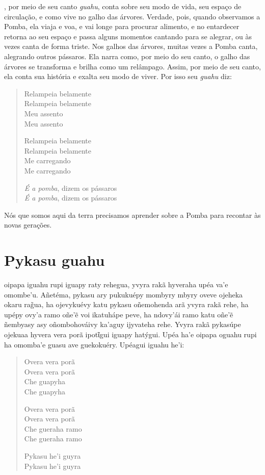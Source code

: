, por meio de seu canto \textit{guahu}, conta sobre seu modo de vida,
seu espaço de circulação, e como vive no galho das árvores. Verdade,
pois, quando observamos a Pomba, ela viaja e voa, e vai longe para
procurar alimento, e no entardecer retorna ao seu espaço e passa alguns
momentos cantando para se alegrar, ou às vezes canta de forma triste.
Nos galhos das árvores, muitas vezes a Pomba canta, alegrando outros
pássaros. Ela narra como, por meio do seu canto, o galho das árvores se
transforma e brilha como um relâmpago. Assim, por meio de seu canto, ela
conta sua história e exalta seu modo de viver. Por isso seu \textit{guahu}
diz:

\begin{verse}
Relampeia belamente\\
Relampeia belamente\\
Meu assento\\
Meu assento

Relampeia belamente\\
Relampeia belamente\\
Me carregando\\
Me carregando

\textit{É a pomba}, dizem os pássaros\\
\textit{É a pomba}, dizem os pássaros
\end{verse}

Nós que somos aqui da terra precisamos aprender sobre a Pomba para
recontar às novas gerações.

\chapter{Pykasu guahu}

 oipapa iguahu rupi iguapy raty rehegua, yvyra rakã hyveraha upéa
va'e omombe'u. Añetéma, pykasu ary pukukuépy mombyry mbyry oveve ojeheka
okaru rag̃ua, ha ojevykuévy katu pykasu oñemohenda arã yvyra rakã rehe,
ha upépy ovy'a ramo oñe'ẽ voi ikatuhápe peve, ha ndovy'ái ramo katu
oñe'ẽ ñembyasy asy oñombohováivy ka'aguy ijyvateha rehe. Yvyra rakã
pykasúpe ojekuaa hyvera vera porã ipotῖgui iguapy hatýgui. Upéa ha'e
oipapa oguahu rupi ha omomba'e guasu ave guekokuéry. Upéagui iguahu
he'i:

\begin{verse}
Overa vera porã\\
Overa vera porã\\
Che guapyha\\
Che guapyha

Overa vera porã\\
Overa vera porã\\
Che gueraha ramo\\
Che gueraha ramo

Pykasu he'i guyra\\
Pykasu he'i guyra
\end{verse}

